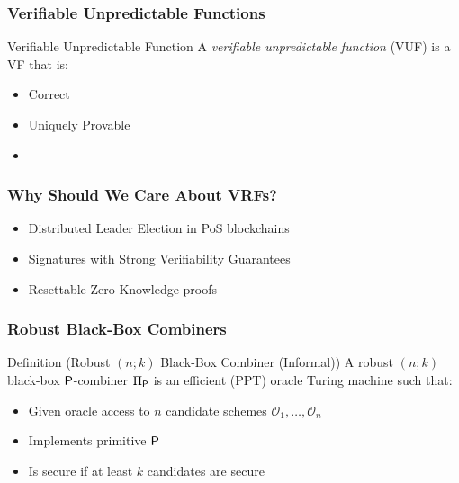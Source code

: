 \begin{frame}
    \frametitle{Verifiable Unpredictable Functions}
    \begin{block}{Verifiable Unpredictable Function}
        A \emph{verifiable unpredictable function} (VUF) is a VF that is:
        \begin{itemize}
            \item Correct
            \item Uniquely Provable
            \item {}
        \end{itemize}
    \end{block}
\end{frame}

\begin{frame}[c]
    \frametitle{Why Should We Care About VRFs?}

    {\huge
    \begin{itemize}\setlength{\itemsep}{1em}
        \item<1-> Distributed Leader Election in PoS blockchains 
        \item<2-> Signatures with Strong Verifiability Guarantees 
        \item<3-> Resettable Zero-Knowledge proofs 
    \end{itemize}
    }
\end{frame}

\begin{frame}
    \frametitle{Robust Black-Box Combiners}
    \begin{block}{Definition (Robust $(n;k)$ Black-Box Combiner (Informal))}
        A robust $(n;k)$ black-box $\textup{\textsf{P}}$-combiner $\BBComb{P}$ is an efficient (PPT) oracle Turing machine such that:
        \begin{itemize}
            \item Given oracle access to $n$ candidate schemes $\mathcal O_1, \ldots, \mathcal O_n$
            \item Implements primitive $\textup{\textsf{P}}$
            \item Is secure if at least $k$ candidates are secure 
        \end{itemize}
    \end{block}
\end{frame}

